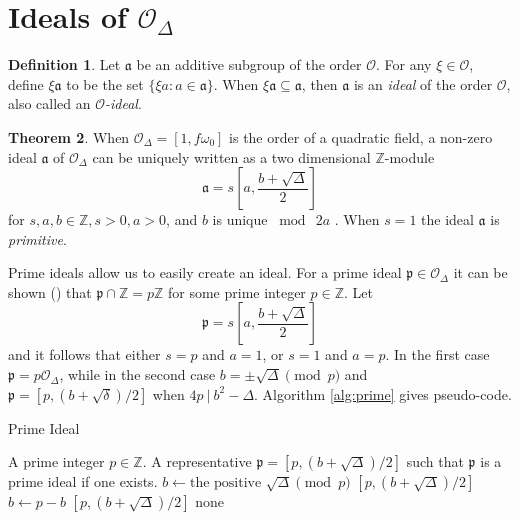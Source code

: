 \documentclass{ucalgthes1}
\theoremstyle{definition}
\newtheorem{thm}{Theorem}[section]
\newtheorem{defn}[thm]{Definition}
\newcommand{\OO}{\mathcal{O}}
\newcommand{\ZZ}{\mathbb{Z}}
\begin{document}
\bigbreak
\section{Ideals of $\OO_\Delta$}

\begin{defn}
Let $\mathfrak a$ be an additive subgroup of the order $\OO$.  For any $\xi \in \OO$, define $\xi \mathfrak a$ to be the set $\{\xi a : a \in \mathfrak a\}$.  When $\xi \mathfrak a \subseteq \mathfrak a$, then $\mathfrak a$ is an \emph{ideal} of the order $\OO$, also called an \emph{$\OO$-ideal}.
\end{defn}

\begin{thm}
\label{thm:idealZModule}
When $\OO_\Delta = [1, f\omega_0]$ is the order of a quadratic field, a non-zero ideal $\mathfrak a$ of $\OO_\Delta$ can be uniquely written as a two dimensional $\ZZ$-module 
\[
	\mathfrak a = s\left[a, \frac{b+\sqrt{\Delta}}{2} \right]
\]
for $s, a, b \in \ZZ, s > 0, a > 0$, and $b$ is unique $\bmod ~2a$ \cite[p.86]{Jacobson2009}. When $s = 1$ the ideal $\mathfrak a$ is \emph{primitive}.
\end{thm}

Prime ideals allow us to easily create an ideal.  For a prime ideal $\mathfrak p \in \OO_\Delta$ it can be shown (\cite[p.19]{Jacobson1999}) that $\mathfrak p \cap \ZZ = p\ZZ$ for some prime integer $p \in \ZZ$. Let
\[
	\mathfrak p = s\left[a, \frac{b + \sqrt{\Delta}}{2}\right]
\]
and it follows that either $s=p$ and $a=1$, or $s=1$ and $a=p$.  In the first case $\mathfrak p = p\OO_\Delta$, while in the second case $b = \pm \sqrt{\Delta} \pmod p$ and $\mathfrak p = [p, (b + \sqrt{\delta})/2]$ when $4p ~|~ b^2 - \Delta$.  Algorithm \ref{alg:prime} gives pseudo-code.

\begin{algorithm}[h]
\caption{Prime Ideal}
\label{alg:prime}
\begin{algorithmic}[1]
\REQUIRE A prime integer $p \in \ZZ$.
\ENSURE A representative $\mathfrak p = [p, (b+\sqrt\Delta)/2]$ such that $\mathfrak p$ is a prime ideal if one exists.
\STATE $b \gets \textrm{the positive } \sqrt\Delta \pmod p$
	\RETURN $[p, (b+\sqrt\Delta)/2]$
\ENDIF
\STATE $b \gets p-b$
	\RETURN $[p, (b+\sqrt\Delta)/2]$
\ENDIF
\RETURN none
\end{algorithmic}
\end{algorithm}
\end{document}
